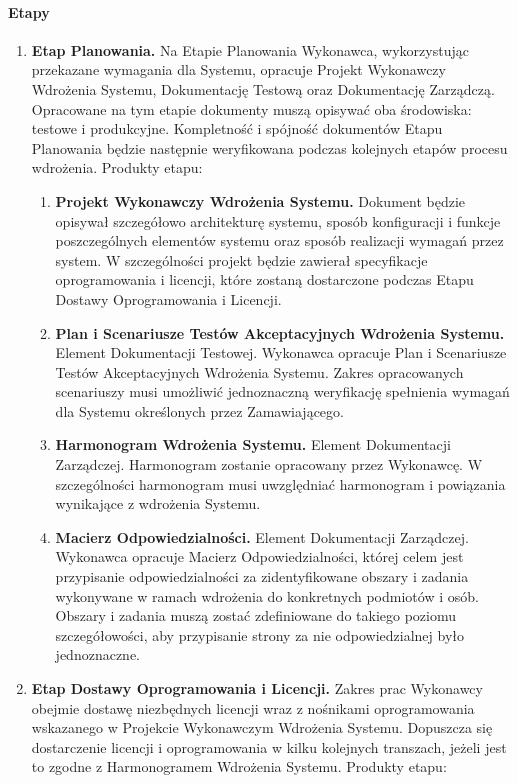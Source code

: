 \documentclass{article}
\begin{document}
\paragraph{Etapy}
\begin{enumerate}
\item \textbf{Etap Planowania.} 
Na Etapie Planowania Wykonawca, wykorzystując przekazane wymagania dla Systemu, opracuje Projekt Wykonawczy Wdrożenia Systemu, Dokumentację Testową oraz Dokumentację Zarządczą. Opracowane na tym etapie dokumenty muszą opisywać oba środowiska: testowe i produkcyjne. Kompletność i spójność dokumentów Etapu Planowania będzie następnie weryfikowana podczas kolejnych etapów procesu wdrożenia.
Produkty etapu:
\begin{enumerate}
\item \textbf{Projekt Wykonawczy Wdrożenia Systemu.}
Dokument będzie opisywał szczegółowo architekturę systemu, sposób konfiguracji i funkcje poszczególnych elementów systemu oraz sposób realizacji wymagań przez system. W szczególności projekt będzie zawierał specyfikacje oprogramowania i licencji, które zostaną dostarczone podczas Etapu Dostawy Oprogramowania i Licencji. 
\item \textbf{Plan i Scenariusze Testów Akceptacyjnych Wdrożenia Systemu.} 
Element Dokumentacji Testowej. Wykonawca opracuje Plan i Scenariusze Testów Akceptacyjnych Wdrożenia Systemu. Zakres opracowanych scenariuszy musi umożliwić jednoznaczną weryfikację spełnienia wymagań dla Systemu określonych przez Zamawiającego.
\item \textbf{Harmonogram Wdrożenia Systemu.}
Element Dokumentacji Zarządczej. Harmonogram zostanie opracowany przez Wykonawcę. W szczególności harmonogram musi uwzględniać harmonogram i powiązania wynikające z wdrożenia Systemu.
\item \textbf{Macierz Odpowiedzialności.}
Element Dokumentacji Zarządczej. Wykonawca opracuje Macierz Odpowiedzialności, której celem jest przypisanie odpowiedzialności za zidentyfikowane obszary i zadania wykonywane w ramach wdrożenia do konkretnych podmiotów i osób. Obszary i zadania muszą zostać zdefiniowane do takiego poziomu szczegółowości, aby przypisanie strony za nie odpowiedzialnej było jednoznaczne.
\end{enumerate}
\item \textbf{Etap Dostawy Oprogramowania i Licencji.}
Zakres prac Wykonawcy obejmie dostawę niezbędnych licencji wraz z nośnikami oprogramowania wskazanego w Projekcie Wykonawczym Wdrożenia Systemu. Dopuszcza się dostarczenie licencji i oprogramowania w kilku kolejnych transzach, jeżeli jest to zgodne z Harmonogramem Wdrożenia Systemu. Produkty etapu:

\end{enumerate}
\end{document}
